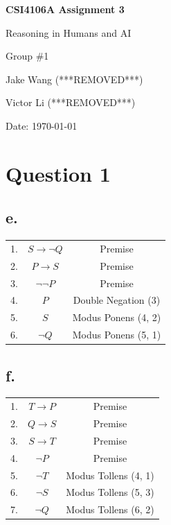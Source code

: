 \documentclass[12pt, a4paper]{article}
\begin{document}
\begin{titlepage}
    \centering
    \vspace*{\fill}
    {\huge\bfseries CSI4106A Assignment 3 \par}
    \vspace{1cm}
    {\Large Reasoning in Humans and AI \par}
    \vspace{2cm}
    {\Large Group \#1 \par}
    \vspace{0.5 cm}
    {\Large Jake Wang (***REMOVED***) \par}
    {\Large Victor Li (***REMOVED***) \par}
    \vspace{2cm}
    {\large Date: \today \par}
    \vspace*{\fill}
\end{titlepage}


\tableofcontents

\newpage
\section*{Question 1}
\subsection*{e.}
\begin{tabular}{ccc}
1. & $S \rightarrow \lnot Q$ & Premise \\
2. & $P \rightarrow S$ & Premise \\
3. & $\lnot\lnot P$ & Premise \\
4. & $P$ & Double Negation (3) \\
5. & $S$ & Modus Ponens (4, 2) \\
6. & $\lnot Q$ & Modus Ponens (5, 1) \\
\end{tabular}

\subsection*{f.}
\begin{tabular}{ccc}
1. & $T \rightarrow P$ & Premise \\
2. & $Q \rightarrow S$ & Premise \\
3. & $S \rightarrow T$ & Premise \\
4. & $\lnot P$ & Premise\\
5. & $\lnot T$ & Modus Tollens (4, 1) \\
6. & $\lnot S$ & Modus Tollens (5, 3) \\
7. & $\lnot Q$ & Modus Tollens (6, 2) \\
\end{tabular}
\end{document}
